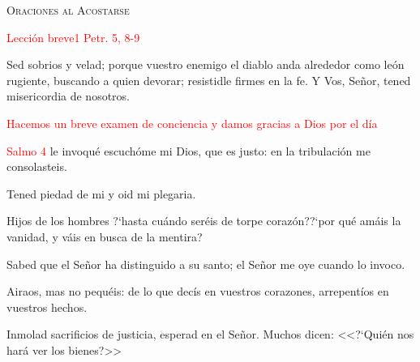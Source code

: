 \documentclass[9pt]{article}
\begin{document}
\newpage

\begin{center}
      \textsc{\Large{Oraciones al Acostarse}}
\end{center}

\begin{multicols}{2}
      \noindent\textcolor{red}{Lección breve}\hfill\textcolor{red}{1 Petr. 5, 8-9}
      
      Sed sobrios y velad; porque vuestro enemigo el diablo anda alrededor como león rugiente, buscando a quien devorar; resistidle firmes en la fe.
      Y Vos, Señor, tened misericordia de nosotros.

      \vspace{1mm}


      \begin{otherlanguage}{latin}
            
      \end{otherlanguage}\vspace{-3mm}

      \textcolor{red}{Hacemos un breve examen de conciencia y damos gracias a Dios por el día}

      \vspace{1mm}

      \begin{otherlanguage}{latin}
            
      \end{otherlanguage}

      \vspace{1mm}

      \hfill\textcolor{red}{Salmo 4}
      le invoqué escuchóme mi Dios, que es justo: en la tribulación me consolasteis.

      Tened piedad de mi y oid mi plegaria.

      Hijos de los hombres {?`}hasta cuándo seréis de torpe corazón?{?`}por qué amáis la vanidad, y váis en busca de la mentira?

      Sabed que el Señor ha distinguido a su santo; el Señor me oye cuando lo invoco.

      Airaos, mas no pequéis: de lo que decís en vuestros corazones, arrepentíos en vuestros hechos.
      
      Inmolad sacrificios de justicia, esperad en el Señor. Muchos dicen: <<{?`}Quién nos hará ver los bienes?>>


\end{multicols}
\end{document}
